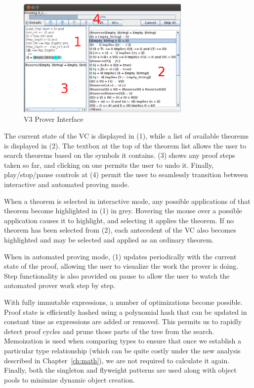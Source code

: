 \begin{figure}
  \centering
    \includegraphics[width=0.75\textwidth]{newProverInterface}
  \caption{V3 Prover Interface\label{newProverInterface}}
\end{figure}

The current state of the VC is displayed in (1), while a list of available theorems is displayed in (2).  The textbox at the top of the theorem list allows the user to search theorems based on the symbols it contains.  (3) shows any proof steps taken so far, and clicking on one permits the user to undo it.  Finally, play/stop/pause controls at (4) permit the user to seamlessly transition between interactive and automated proving mode.

When a theorem is selected in interactive mode, any possible applications of that theorem become highlighted in (1) in grey.  Hovering the mouse over a possible application causes it to highlight, and selecting it applies the theorem.  If no theorem has been selected from (2), each antecedent of the VC also becomes highlighted and may be selected and applied as an ordinary theorem.

When in automated proving mode, (1) updates periodically with the current state of the proof, allowing the user to visualize the work the prover is doing.  Step functionality is also provided on pause to allow the user to watch the automated prover work step by step.

With fully immutable expressions, a number of optimizations become possible.  Proof state is efficiently hashed using a polynomial hash that can be updated in constant time as expressions are added or removed.  This permits us to rapidly detect proof cycles and prune those parts of the tree from the search.  Memoization is used when comparing types to ensure that once we establish a particular type relationship (which can be quite costly under the new analysis described in Chapter~\ref{ch:math}), we are not required to calculate it again.  Finally, both the singleton and flyweight patterns are used along with object pools to minimize dynamic object creation.

